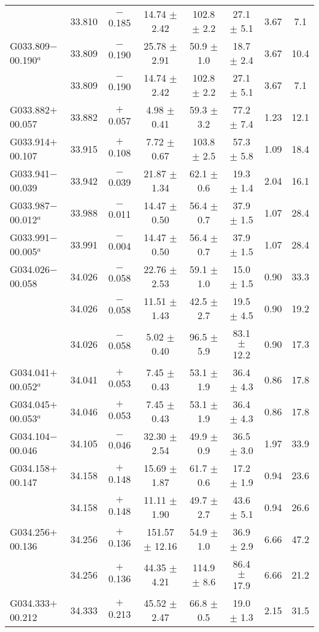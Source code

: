 \begin{ThreePartTable}
\begin{longtable}{lccccccc}
                      &33.810&	$-$0.185	&14.74	$\pm$ 2.42	&102.8	$\pm$ 2.2	&27.1	$\pm$ 5.1	&3.67	&7.1\\
G033.809$-$00.190$^a$ &33.809&	$-$0.190	&25.78	$\pm$ 2.91	&50.9	$\pm$ 1.0	&18.7	$\pm$ 2.4	&3.67	&10.4\\
                      &33.809&	$-$0.190	&14.74	$\pm$ 2.42	&102.8	$\pm$ 2.2	&27.1	$\pm$ 5.1	&3.67	&7.1\\
G033.882$+$00.057     &33.882&	$+$0.057	&4.98	$\pm$ 0.41	&59.3	$\pm$ 3.2	&77.2	$\pm$ 7.4	&1.23	&12.1\\
G033.914$+$00.107     &33.915&	$+$0.108	&7.72	$\pm$ 0.67	&103.8	$\pm$ 2.5	&57.3	$\pm$ 5.8	&1.09	&18.4\\
G033.941$-$00.039     &33.942&	$-$0.039	&21.87	$\pm$ 1.34	&62.1	$\pm$ 0.6	&19.3	$\pm$ 1.4	&2.04	&16.1\\
G033.987$-$00.012$^a$ &33.988&	$-$0.011	&14.47	$\pm$ 0.50	&56.4	$\pm$ 0.7	&37.9	$\pm$ 1.5	&1.07	&28.4\\
G033.991$-$00.005$^a$ &33.991&	$-$0.004	&14.47	$\pm$ 0.50	&56.4	$\pm$ 0.7	&37.9	$\pm$ 1.5	&1.07	&28.4\\
G034.026$-$00.058     &34.026&	$-$0.058	&22.76	$\pm$ 2.53	&59.1	$\pm$ 1.0	&15.0	$\pm$ 1.5	&0.90	&33.3\\
                      &34.026&	$-$0.058	&11.51	$\pm$ 1.43	&42.5	$\pm$ 2.7	&19.5	$\pm$ 4.5	&0.90	&19.2\\
                      &34.026&	$-$0.058	&5.02	$\pm$ 0.40	&96.5	$\pm$ 5.9	&83.1	$\pm$ 12.2	&0.90	&17.3\\
G034.041$+$00.052$^a$ &34.041&	$+$0.053	&7.45	$\pm$ 0.43	&53.1	$\pm$ 1.9	&36.4	$\pm$ 4.3	&0.86	&17.8\\
G034.045$+$00.053$^a$ &34.046&	$+$0.053	&7.45	$\pm$ 0.43	&53.1	$\pm$ 1.9	&36.4	$\pm$ 4.3	&0.86	&17.8\\
G034.104$-$00.046     &34.105&	$-$0.046	&32.30	$\pm$ 2.54	&49.9	$\pm$ 0.9	&36.5	$\pm$ 3.0	&1.97	&33.9\\
G034.158$+$00.147     &34.158&	$+$0.148	&15.69	$\pm$ 1.87	&61.7	$\pm$ 0.6	&17.2	$\pm$ 1.9	&0.94	&23.6\\
                      &34.158&	$+$0.148	&11.11	$\pm$ 1.90	&49.7	$\pm$ 2.7	&43.6	$\pm$ 5.1	&0.94	&26.6\\
G034.256$+$00.136     &34.256&	$+$0.136	&151.57	$\pm$ 12.16	&54.9	$\pm$ 1.0	&36.9	$\pm$ 2.9	&6.66	&47.2\\
                      &34.256&	$+$0.136	&44.35	$\pm$ 4.21	&114.9	$\pm$ 8.6	&86.4	$\pm$ 17.9	&6.66	&21.2\\
G034.333$+$00.212     &34.333&	$+$0.213	&45.52	$\pm$ 2.47	&66.8	$\pm$ 0.5	&19.0	$\pm$ 1.3	&2.15	&31.5\\

\end{longtable}
\end{ThreePartTable}
